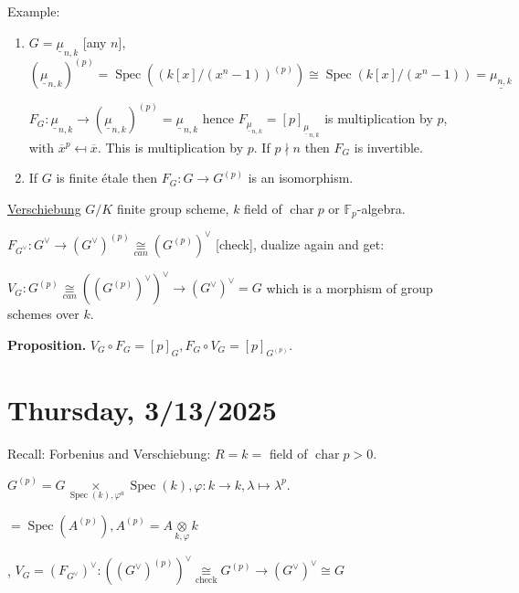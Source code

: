 \documentclass{article}
\theoremstyle{definition}
\numberwithin{theorem}{subsection}
\begin{document}
    Example:

    \begin{enumerate}[label=\arabic*)]
        \item \(G = \underline{\mu}_{n,k}\) [any \(n\)], \((\underline{\mu}_{n,k})^{(p)} = \operatorname{Spec}\left( \left( k[x] / (x^n - 1) \right) ^{(p)} \right) \cong \operatorname{Spec} \left( k[x] / (x^n - 1) \right) = \underline{\mu_{n,k}}\)
        
        \(F_G: \underline{\mu}_{n,k} \to (\underline{\mu}_{n,k})^{(p)} = \underline{\mu}_{n,k}\) hence \(F_{\underline{\mu}_{n,k}} = [p]_{\underline{\mu}_{n,k}}\) is multiplication by \(p\), with \(\overline{x}^p \mapsfrom \overline{x}\). This is multiplication by \(p\). If \(p\nmid n\) then \(F_G\) is invertible.
        
        \item If \(G\) is finite \'etale then \(F_G: G \to G^{(p)}\) is an isomorphism.
        
    \end{enumerate} 

    \underline{Verschiebung} \(G / K\) finite group scheme, \(k\) field of \(\operatorname{char} p\) or \(\mathbb{F}_p\)-algebra.
    
    \(F_{G^\vee}: G^\vee \to (G^\vee)^{(p)} \underset{can}{\cong} (G^{(p)})^\vee\) [check], dualize again and get:

    \(V_G: G^{(p)} \underset{can}{\cong} ((G^{(p)})^\vee)^\vee \to (G^\vee)^\vee = G\) which is a morphism of group schemes over \(k\).
    
    \textbf{Proposition.} \(V_G \circ F_G = [p]_G, F_G \circ V_G = [p]_{G^{(p)}}\).

    \section*{Thursday, 3/13/2025}
    
    Recall: Forbenius and Verschiebung: \(R=k=\) field of \(\operatorname{char} p > 0\).

    \(G^{(p)} = G \underset{\operatorname{Spec}(k),\varphi^a}{\times} \operatorname{Spec}(k), \varphi : k \to k, \lambda \mapsto \lambda^p\).
    
    \(= \operatorname{Spec}(A^{(p)}), A^{(p)}= A \underset{k,\varphi}{\otimes} k\)


    , \(V_G = (F_{G^\vee})^\vee:((G^\vee)^{(p)})^\vee \underset{\text{check}}{\cong} G^{(p)} \to (G^\vee)^\vee\cong G\)
    
\end{document}
